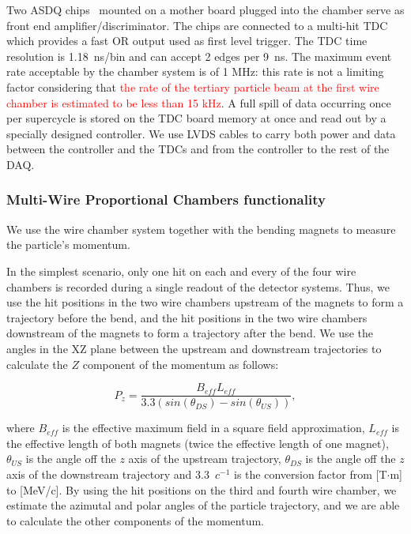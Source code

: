 Two ASDQ chips~\cite{ASDQchip} mounted on a mother board plugged into the chamber serve as front end amplifier/discriminator. The chips are connected to a multi-hit TDC~\cite{Sten} which provides a fast OR output used as first level trigger. The TDC time resolution is 1.18~ns/bin and can accept 2 edges per 9~ns.  
The maximum event rate acceptable by the chamber system is of 1 MHz: this rate is not a limiting factor considering that \textcolor{red}{the rate of the tertiary particle beam at the first wire chamber is estimated to be less than 15 kHz}. A full spill of data occurring once per supercycle is stored on the TDC board memory at once and read out by a specially designed controller.  We use LVDS cables to carry both power and data between the controller and the TDCs and from the controller to the rest of the DAQ.  

\subsubsection{Multi-Wire Proportional Chambers functionality}\label{sec:MWPCfunc}
We use the wire chamber system together with the bending magnets to measure the particle's momentum.

In the simplest scenario, only one hit on each and every of the four wire chambers is recorded during a single readout of the detector systems.  Thus, we use the hit positions in the two wire chambers upstream of the magnets to form a trajectory before the bend, and the hit positions in the two wire chambers downstream of the magnets to form a trajectory after the bend. We use the angles in the XZ plane between the upstream and downstream trajectories  to calculate the $Z$ component of the momentum as follows:

\begin{equation}
P_z=\frac{B_{eff}L_{eff}}{3.3(sin(\theta_{DS})-sin(\theta_{US}))},
\label{eq:momformula}
\end{equation}

where $B_{eff}$ is the effective maximum field in a square field approximation,  $L_{eff}$ is the effective length of both magnets (twice the effective length of one magnet), $\theta_{US}$ is the angle off the $z$ axis of the upstream trajectory, $\theta_{DS}$ is the angle off the $z$ axis of the downstream trajectory  and  3.3~$c^{-1}$ is the conversion factor from [T$\cdot$m] to [MeV/c]. By using the hit positions on the third and fourth wire chamber, we estimate the azimutal and polar angles of the particle trajectory, and we are able to calculate the other components of the momentum. 

